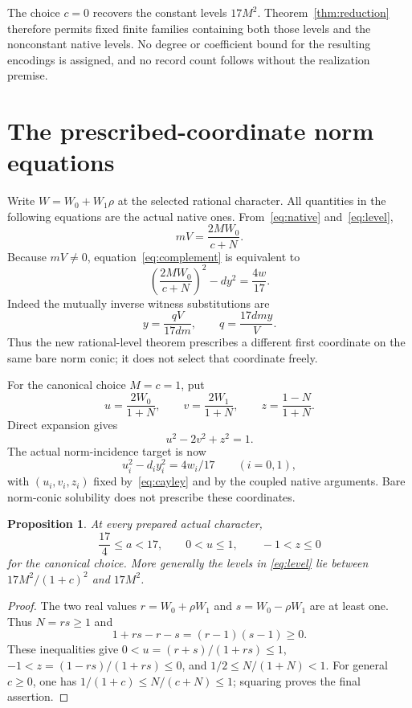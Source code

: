 \documentclass[11pt,a4paper]{article}
\newtheorem{proposition}[theorem]{Proposition}
\begin{document}
The choice $c=0$ recovers the constant levels $17M^2$.
Theorem~\ref{thm:reduction} therefore permits fixed finite families
containing both those levels and the nonconstant native levels.
No degree or coefficient bound for the resulting encodings is
assigned, and no record count follows without the realization premise.

\section{The prescribed-coordinate norm equations}

Write $W=W_0+W_1\rho$ at the selected rational character.
All quantities in the following equations are the actual native ones.
From~\eqref{eq:native} and~\eqref{eq:level},
\[
                           mV=\frac{2MW_0}{c+N}.
\]
Because $mV\ne0$, equation~\eqref{eq:complement} is equivalent to
\begin{equation}\label{eq:normtarget}
                  \left(\frac{2MW_0}{c+N}\right)^2-dy^2
                             =\frac{4w}{17}.
\end{equation}
Indeed the mutually inverse witness substitutions are
\[
                          y=\frac{qV}{17dm},\qquad
                          q=\frac{17dmy}{V}.
\]
Thus the new rational-level theorem prescribes a different first
coordinate on the same bare norm conic; it does not select that
coordinate freely.

For the canonical choice $M=c=1$, put
\begin{equation}\label{eq:cayley}
 u=\frac{2W_0}{1+N},\qquad
 v=\frac{2W_1}{1+N},\qquad
 z=\frac{1-N}{1+N}.
\end{equation}
Direct expansion gives
\begin{equation}\label{eq:quadric}
                              u^2-2v^2+z^2=1.
\end{equation}
The actual norm-incidence target is now
\[
                     u_i^2-d_i y_i^2=4w_i/17\qquad(i=0,1),
\]
with $(u_i,v_i,z_i)$ fixed by~\eqref{eq:cayley} and by the coupled
native arguments. Bare norm-conic solubility does not prescribe these
coordinates.

\begin{proposition}\label{prop:bounds}
At every prepared actual character,
\[
             \frac{17}{4}\le a<17,\qquad 0<u\le1,
             \qquad -1<z\le0
\]
for the canonical choice. More generally the levels in
\eqref{eq:level} lie between $17M^2/(1+c)^2$ and $17M^2$.
\end{proposition}
\begin{proof}
The two real values $r=W_0+\rho W_1$ and $s=W_0-\rho W_1$
are at least one. Thus $N=rs\ge1$ and
\[
                 1+rs-r-s=(r-1)(s-1)\ge0.
\]
These inequalities give $0<u=(r+s)/(1+rs)\le1$,
$-1<z=(1-rs)/(1+rs)\le0$, and
$1/2\le N/(1+N)<1$.
For general $c\ge0$, one has
$1/(1+c)\le N/(c+N)\le1$; squaring proves the final assertion.
\end{proof}
\end{document}
